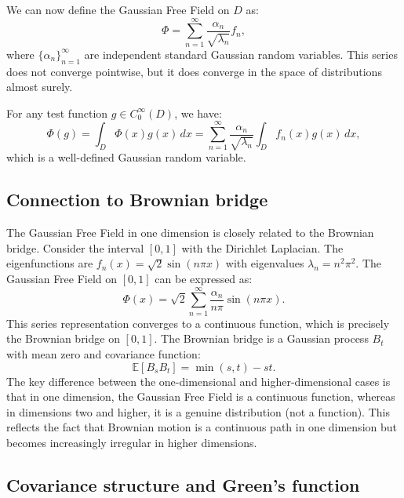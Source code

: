 \documentclass[letterpaper,11pt,oneside,reqno]{article}
\numberwithin{equation}{section}
\theoremstyle{definition}
\begin{document}
We can now define the Gaussian Free Field on $D$ as:
\begin{equation}
    \Phi = \sum_{n=1}^{\infty} \frac{\alpha_n}{\sqrt{\lambda_n}} f_n,
\end{equation}
where $\{\alpha_n\}_{n=1}^{\infty}$ are independent standard Gaussian random variables. This series does not converge pointwise, but it does converge in the space of distributions almost surely.

For any test function $g \in C_0^{\infty}(D)$, we have:
\begin{equation}
    \Phi(g) = \int_D \Phi(x) g(x) \, dx = \sum_{n=1}^{\infty} \frac{\alpha_n}{\sqrt{\lambda_n}} \int_D f_n(x) g(x) \, dx,
\end{equation}
which is a well-defined Gaussian random variable.

\subsection{Connection to Brownian bridge}

The Gaussian Free Field in one dimension is closely related to the Brownian bridge. Consider the interval $[0,1]$ with the Dirichlet Laplacian. The eigenfunctions are $f_n(x) = \sqrt{2} \sin(n\pi x)$ with eigenvalues $\lambda_n = n^2 \pi^2$. The Gaussian Free Field on $[0,1]$ can be expressed as:
\begin{equation}
	\label{eq:Phi_1d}
    \Phi(x) = \sqrt{2} \sum_{n=1}^{\infty} \frac{\alpha_n}{n\pi} \sin(n\pi x).
\end{equation}
This series representation converges to a continuous function, which is precisely the Brownian bridge on $[0,1]$. The Brownian bridge is a Gaussian process $B_t$ with mean zero and covariance function:
\begin{equation}
	\label{eq:covariance_1d}
    \mathbb{E}[B_s B_t] = \min(s, t) - st.
\end{equation}
The key difference between the one-dimensional and higher-dimensional cases is that in one dimension, the Gaussian Free Field is a continuous function, whereas in dimensions two and higher, it is a genuine distribution (not a function). This reflects the fact that Brownian motion is a continuous path in one dimension but becomes increasingly irregular in higher dimensions.

\subsection{Covariance structure and Green's function}
\end{document}
